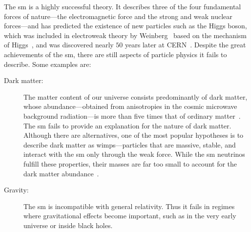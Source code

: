The \gls{sm} is a highly successful theory. It describes three of the four fundamental forces of nature---the electromagnetic force and the strong and weak nuclear forces---and has predicted the existence of new particles such as the Higgs boson, which was included in electroweak theory by Weinberg~\cite{Weinberg:1967tq} based on the mechanism of Higgs~\cite{Higgs:1964ia,Higgs:1964pj,Higgs:1966ev}, and was discovered nearly $50$ years later at CERN~\cite{ATLAS:2012yve,CMS:2012qbp}.
Despite the great achievements of the \gls{sm}, there are still aspects of particle physics it fails to describe. Some examples are:
\begin{description}
    \item[Dark matter:] The matter content of our universe consists predominantly of dark matter, whose abundance---obtained from anisotropies in the cosmic microwave background radiation---is more than five times that of ordinary matter~\cite{Planck:2018vyg}.
    The \gls{sm} fails to provide an explanation for the nature of dark matter.
    Although there are alternatives, one of the most popular hypotheses is to describe dark matter as \glspl{wimp}---particles that are massive, stable, and interact with the \gls{sm} only through the weak force.
    While the \gls{sm} neutrinos fulfill these properties, their masses are far too small to account for the dark matter abundance~\cite{Sokolenko:2019ngf}.
    
    \item[Gravity:] The \gls{sm} is incompatible with general relativity. Thus it fails in regimes where gravitational effects become important, such as in the very early universe or inside black holes.
    

\end{description}

